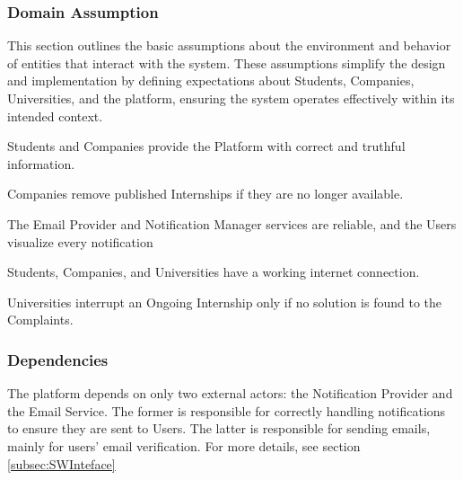 \subsubsection{Domain Assumption}
This section outlines the basic assumptions about the environment and behavior of entities that interact with the system. These assumptions simplify the design and implementation by defining expectations about Students, Companies, Universities, and the platform, ensuring the system operates effectively within its intended context.
\begin{enumerate}[label={\color{titleColor}[D\arabic*]}]
    \item Students and Companies provide the Platform with correct and truthful information.
    \item Companies remove published Internships if they are no longer available.
    \item The Email Provider and Notification Manager services are reliable, and the Users visualize every notification
    \item Students, Companies, and Universities have a working internet connection.
    \item Universities interrupt an Ongoing Internship only if no solution is found to the Complaints.
\end{enumerate}

\subsubsection{Dependencies}
The platform depends on only two external actors: the Notification Provider and the Email Service.
The former is responsible for correctly handling notifications to ensure they are sent to Users. 
The latter is responsible for sending emails, mainly for users' email verification. For more details, see section \ref{subsec:SWInteface}